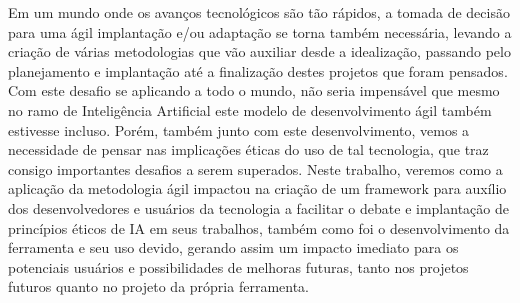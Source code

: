 Em um mundo onde os avanços tecnológicos são tão rápidos, a tomada de decisão para uma ágil implantação e/ou adaptação se torna também necessária, levando a criação de várias metodologias que vão auxiliar desde a idealização, passando pelo planejamento e implantação até a finalização destes projetos que foram pensados. Com este desafio se aplicando a todo o mundo, não seria impensável que mesmo no ramo de Inteligência Artificial este modelo de desenvolvimento ágil também estivesse incluso. Porém, também junto com este desenvolvimento, vemos a necessidade de pensar nas implicações éticas do uso de tal tecnologia, que traz consigo importantes desafios a serem superados. Neste trabalho, veremos como a aplicação da metodologia ágil impactou na criação de um framework para auxílio dos desenvolvedores e usuários da tecnologia a facilitar o debate e implantação de princípios éticos de IA em seus trabalhos, também como foi o desenvolvimento da ferramenta e seu uso devido, gerando assim um impacto imediato para os potenciais usuários e possibilidades de melhoras futuras, tanto nos projetos futuros quanto no projeto da própria ferramenta.